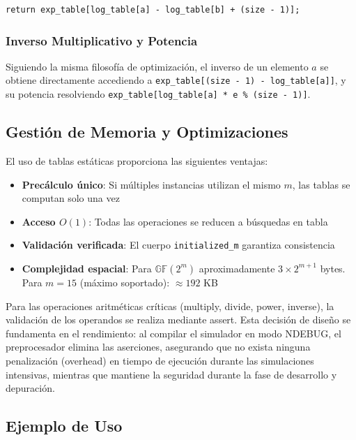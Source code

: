\begin{lstlisting}[style=CodigoCPP, caption={Cálculo de la división en el cuerpo finito utilizando sumas de índices logarítmicos.}, label={lst:gf_division}]
return exp_table[log_table[a] - log_table[b] + (size - 1)];
\end{lstlisting}

\subsubsection{Inverso Multiplicativo y Potencia} 
Siguiendo la misma filosofía de optimización, el inverso de un elemento $a$ se obtiene directamente accediendo a \texttt{exp\_table[(size - 1) - log\_table[a]]}, y su potencia resolviendo \texttt{exp\_table[log\_table[a] * e \% (size - 1)]}.

\subsection{Gestión de Memoria y Optimizaciones}

El uso de tablas estáticas proporciona las siguientes ventajas:

\begin{itemize}
    \item \textbf{Precálculo único}: Si múltiples instancias utilizan el mismo $m$, las tablas se computan solo una vez
    \item \textbf{Acceso $O(1)$}: Todas las operaciones se reducen a búsquedas en tabla
    \item \textbf{Validación verificada}: El cuerpo \texttt{initialized\_m} garantiza consistencia
    \item \textbf{Complejidad espacial}: Para $\mathbb{GF}(2^m)$ aproximadamente $3 \times 2^{m+1}$ bytes. Para $m = 15$ (máximo soportado): $\approx 192$ KB
\end{itemize}

Para las operaciones aritméticas críticas (multiply, divide, power, inverse), la validación de los operandos se realiza mediante assert. Esta decisión de diseño se fundamenta en el rendimiento: al compilar el simulador en modo NDEBUG, el preprocesador elimina las aserciones, asegurando que no exista ninguna penalización (overhead) en tiempo de ejecución durante las simulaciones intensivas, mientras que mantiene la seguridad durante la fase de desarrollo y depuración.
\subsection{Ejemplo de Uso}

